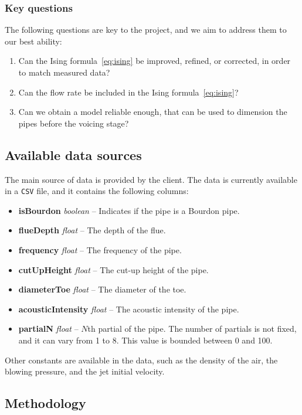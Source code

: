 \documentclass{psu-plan}
\begin{document}
\subsubsection{Key questions}

The following questions are key to the project, and we aim to address them to
our best ability:
\begin{enumerate}
    \item Can the Ising formula~\ref{eq:ising} be improved, refined, or
        corrected, in order to match measured data?
 \item Can the flow rate be included in the Ising formula~\ref{eq:ising}?
 \item Can we obtain a model reliable enough, that can be used to dimension the
        pipes before the voicing stage?
\end{enumerate}

\subsection{Available data sources}

The main source of data is provided by the client.
The data is currently available in a \texttt{CSV} file, and it contains the
following columns:
\begin{itemize}
    \item \textbf{isBourdon} \textit{boolean} -- Indicates if the pipe is a Bourdon pipe.
    \item \textbf{flueDepth} \textit{float} -- The depth of the flue.
    \item \textbf{frequency} \textit{float} -- The frequency of the pipe.
    \item \textbf{cutUpHeight} \textit{float} -- The cut-up height of the pipe.
    \item \textbf{diameterToe} \textit{float} -- The diameter of the toe.
    \item \textbf{acousticIntensity} \textit{float} -- The acoustic intensity of the pipe.
    \item \textbf{partialN} \textit{float} -- \(N\)th partial of the pipe.
        The number of partials is not fixed, and it can vary from 1 to 8.
        This value is bounded between 0 and 100.
\end{itemize}
Other constants are available in the data, such as the density of the air,
the blowing pressure, and the jet initial velocity.

\subsection{Methodology}
\end{document}
